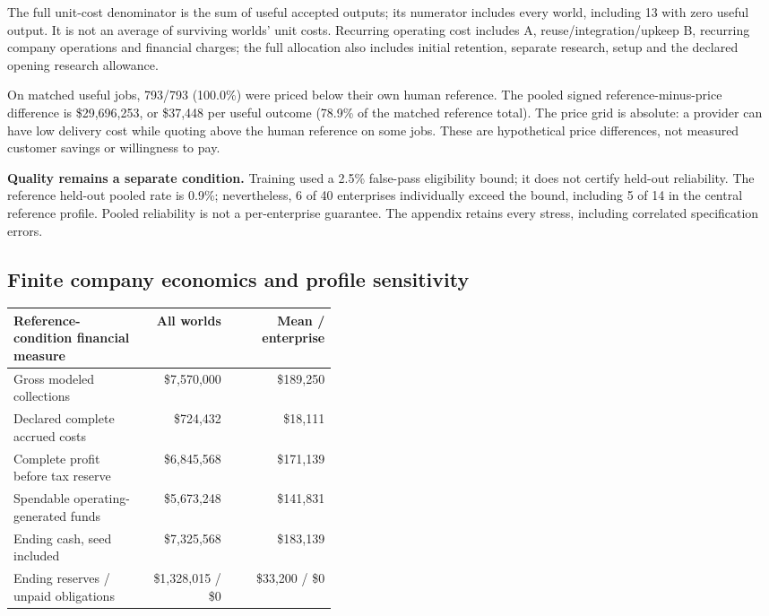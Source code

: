\par\smallskip The full unit-cost denominator is the sum of useful accepted outputs; its numerator includes every world, including 13 with zero useful output. It is not an average of surviving worlds' unit costs. Recurring operating cost includes A, reuse/integration/upkeep B, recurring company operations and financial charges; the full allocation also includes initial retention, separate research, setup and the declared opening research allowance.

On matched useful jobs, 793/793 (100.0\%) were priced below their own human reference. The pooled signed reference-minus-price difference is \$29,696,253, or \$37,448 per useful outcome (78.9\% of the matched reference total). The price grid is absolute: a provider can have low delivery cost while quoting above the human reference on some jobs. These are hypothetical price differences, not measured customer savings or willingness to pay.

\textbf{Quality remains a separate condition.} Training used a 2.5\% false-pass eligibility bound; it does not certify held-out reliability. The reference held-out pooled rate is 0.9\%; nevertheless, 6 of 40 enterprises individually exceed the bound, including 5 of 14 in the central reference profile. Pooled reliability is not a per-enterprise guarantee. The appendix retains every stress, including correlated specification errors.

\subsection{Finite company economics and profile sensitivity}

{\small
\setlength{\tabcolsep}{4pt}
\begin{tabular}{@{}p{0.42\linewidth}rr@{}}
\toprule
Reference-condition financial measure & All worlds & Mean / enterprise \\
\midrule
Gross modeled collections & \$7,570,000 & \$189,250 \\
Declared complete accrued costs & \$724,432 & \$18,111 \\
Complete profit before tax reserve & \$6,845,568 & \$171,139 \\
Spendable operating-generated funds & \$5,673,248 & \$141,831 \\
Ending cash, seed included & \$7,325,568 & \$183,139 \\
Ending reserves / unpaid obligations & \$1,328,015 / \$0 & \$33,200 / \$0 \\
\bottomrule
\end{tabular}
}

